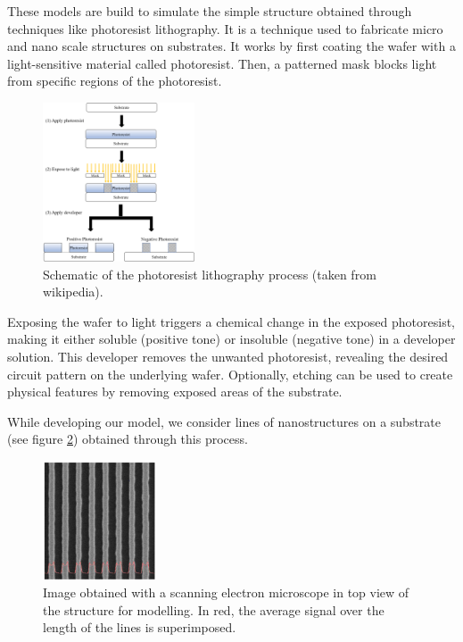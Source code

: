 These models are build to simulate the simple structure obtained through techniques like photoresist 
lithography. It is a technique used to fabricate micro and nano scale structures on substrates. 
It works by first coating the wafer with a light-sensitive material called photoresist. Then, a patterned
 mask blocks light from specific regions of the photoresist. 
 \begin{figure}[h]
    \centering
    \includegraphics[width=0.4\textwidth]{images/photo_resist.png}
    \caption{Schematic of the photoresist lithography process (taken from wikipedia).}
    \label{fig:lithography}
 \end{figure}

 \FloatBarrier

 Exposing the wafer to light triggers a 
 chemical change in the exposed photoresist, making it either soluble (positive tone) or insoluble 
 (negative tone) in a developer solution. This developer removes the unwanted photoresist, 
 revealing the desired circuit pattern on the underlying wafer. Optionally, etching can be used to 
 create physical features by removing exposed areas of the substrate.

 \medskip

While developing our model, we consider lines of nanostructures on a substrate (see figure \ref{fig:lines}) obtained through this process.

\begin{figure}[h]
    \centering
    \includegraphics[width=0.3\textwidth]{images/lines_modeled.png}
    \caption{Image obtained with a scanning electron microscope in 
      top view of the structure for modelling. In red, the average signal over the length of the lines is superimposed.\cite{these_reche}}
    \label{fig:lines}
\end{figure}

